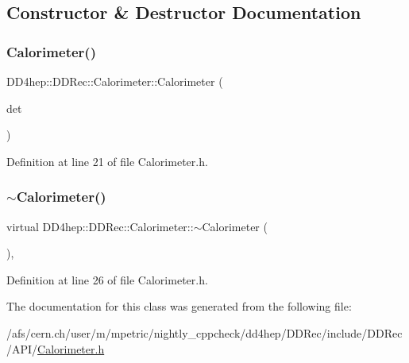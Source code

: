 \subsection{Constructor \& Destructor Documentation}
\hypertarget{class_d_d4hep_1_1_d_d_rec_1_1_calorimeter_a143f17b7c2614d114c1b767122ac0516}{}\label{class_d_d4hep_1_1_d_d_rec_1_1_calorimeter_a143f17b7c2614d114c1b767122ac0516} 
\subsubsection{\texorpdfstring{Calorimeter()}{Calorimeter()}}
{\footnotesize\ttfamily D\+D4hep\+::\+D\+D\+Rec\+::\+Calorimeter\+::\+Calorimeter (\begin{DoxyParamCaption}\item[{const \hyperlink{class_d_d4hep_1_1_geometry_1_1_det_element}{Geometry\+::\+Det\+Element} \&}]{det }\end{DoxyParamCaption})\hspace{0.3cm}{\ttfamily [inline]}}



Definition at line 21 of file Calorimeter.\+h.

\hypertarget{class_d_d4hep_1_1_d_d_rec_1_1_calorimeter_a173a06cc2634725e660a04fa65b36c09}{}\label{class_d_d4hep_1_1_d_d_rec_1_1_calorimeter_a173a06cc2634725e660a04fa65b36c09} 
\subsubsection{\texorpdfstring{$\sim$\+Calorimeter()}{~Calorimeter()}}
{\footnotesize\ttfamily virtual D\+D4hep\+::\+D\+D\+Rec\+::\+Calorimeter\+::$\sim$\+Calorimeter (\begin{DoxyParamCaption}{ }\end{DoxyParamCaption})\hspace{0.3cm}{\ttfamily [inline]}, {\ttfamily [virtual]}}



Definition at line 26 of file Calorimeter.\+h.



The documentation for this class was generated from the following file\+:\begin{DoxyCompactItemize}
\item 
/afs/cern.\+ch/user/m/mpetric/nightly\+\_\+cppcheck/dd4hep/\+D\+D\+Rec/include/\+D\+D\+Rec/\+A\+P\+I/\hyperlink{_calorimeter_8h}{Calorimeter.\+h}\end{DoxyCompactItemize}
